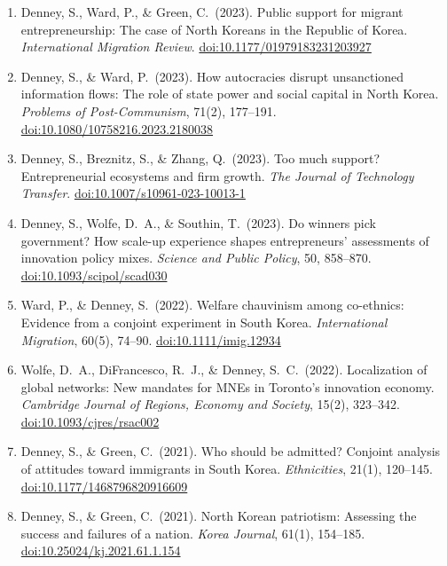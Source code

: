 \documentclass[11pt, a4paper]{article}
\begin{document}
\begin{enumerate}[itemsep=0.15em]
  \item Denney, S., Ward, P., \& Green, C.\ (2023). Public support for migrant entrepreneurship: The case of North Koreans in the Republic of Korea. \textit{International Migration Review}. \href{https://doi.org/10.1177/01979183231203927}{doi:10.1177/01979183231203927}

  \item Denney, S., \& Ward, P.\ (2023). How autocracies disrupt unsanctioned information flows: The role of state power and social capital in North Korea. \textit{Problems of Post-Communism}, 71(2), 177--191. \href{https://doi.org/10.1080/10758216.2023.2180038}{doi:10.1080/10758216.2023.2180038}

  \item Denney, S., Breznitz, S., \& Zhang, Q.\ (2023). Too much support? Entrepreneurial ecosystems and firm growth. \textit{The Journal of Technology Transfer}. \href{https://doi.org/10.1007/s10961-023-10013-1}{doi:10.1007/s10961-023-10013-1}

  \item Denney, S., Wolfe, D.\ A., \& Southin, T.\ (2023). Do winners pick government? How scale-up experience shapes entrepreneurs' assessments of innovation policy mixes. \textit{Science and Public Policy}, 50, 858--870. \href{https://doi.org/10.1093/scipol/scad030}{doi:10.1093/scipol/scad030}

  \item Ward, P., \& Denney, S.\ (2022). Welfare chauvinism among co-ethnics: Evidence from a conjoint experiment in South Korea. \textit{International Migration}, 60(5), 74--90. \href{https://doi.org/10.1111/imig.12934}{doi:10.1111/imig.12934}

  \item Wolfe, D.\ A., DiFrancesco, R.\ J., \& Denney, S.\ C.\ (2022). Localization of global networks: New mandates for MNEs in Toronto's innovation economy. \textit{Cambridge Journal of Regions, Economy and Society}, 15(2), 323--342. \href{https://doi.org/10.1093/cjres/rsac002}{doi:10.1093/cjres/rsac002}

  \item Denney, S., \& Green, C.\ (2021). Who should be admitted? Conjoint analysis of attitudes toward immigrants in South Korea. \textit{Ethnicities}, 21(1), 120--145. \href{https://doi.org/10.1177/1468796820916609}{doi:10.1177/1468796820916609}

  \item Denney, S., \& Green, C.\ (2021). North Korean patriotism: Assessing the success and failures of a nation. \textit{Korea Journal}, 61(1), 154--185. \href{https://doi.org/10.25024/kj.2021.61.1.154}{doi:10.25024/kj.2021.61.1.154}


\end{enumerate}
\end{document}
